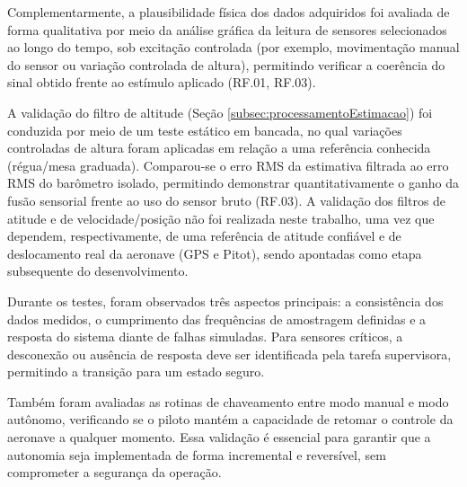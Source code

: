 Complementarmente, a plausibilidade física dos dados adquiridos foi avaliada de forma qualitativa por meio da análise gráfica da leitura de sensores selecionados ao longo do tempo, sob excitação controlada (por exemplo, movimentação manual do sensor ou variação controlada de altura), permitindo verificar a coerência do sinal obtido frente ao estímulo aplicado (RF.01, RF.03).

A validação do filtro de altitude (Seção \ref{subsec:processamentoEstimacao}) foi conduzida por meio de um teste estático em bancada, no qual variações controladas de altura foram aplicadas em relação a uma referência conhecida (régua/mesa graduada). Comparou-se o erro RMS da estimativa filtrada ao erro RMS do barômetro isolado, permitindo demonstrar quantitativamente o ganho da fusão sensorial frente ao uso do sensor bruto (RF.03). A validação dos filtros de atitude e de velocidade/posição não foi realizada neste trabalho, uma vez que dependem, respectivamente, de uma referência de atitude confiável e de deslocamento real da aeronave (GPS e Pitot), sendo apontadas como etapa subsequente do desenvolvimento.

Durante os testes, foram observados três aspectos principais: a consistência dos dados medidos, o cumprimento das frequências de amostragem definidas e a resposta do sistema diante de falhas simuladas. Para sensores críticos, a desconexão ou ausência de resposta deve ser identificada pela tarefa supervisora, permitindo a transição para um estado seguro.

Também foram avaliadas as rotinas de chaveamento entre modo manual e modo autônomo, verificando se o piloto mantém a capacidade de retomar o controle da aeronave a qualquer momento. Essa validação é essencial para garantir que a autonomia seja implementada de forma incremental e reversível, sem comprometer a segurança da operação.